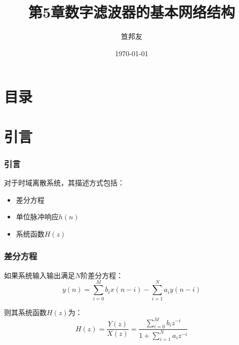 \documentclass[notheorems,compress,mathserif,table]{beamer}
\title{\heiti 第5章\quad 数字滤波器的基本网络结构}
\author[\textcolor{blue}]{{\sihao\kaishu  笪邦友}}
\institute{\sihao\lishu  \textcolor{violet}{中南民族大学~~ 电子信息工程学院}}
\date{\fangsong\today}
\begin{document}
\kaishu
\frame{ \titlepage }
\section*{目录}



\section{引言}
\begin{frame}[shrink]\frametitle{引言}
对于时域离散系统，其描述方式包括：
\begin{itemize}
  \item 差分方程
  \item 单位脉冲响应$h(n)$
  \item 系统函数$H(z)$
\end{itemize}
\end{frame}
\begin{frame}\frametitle{差分方程}
如果系统输入输出满足$N$阶差分方程：
$$
y(n)=\sum_{i=0}^{M}b_ix(n-i) - \sum_{i=1}^{N}a_iy(n-i)
$$
\par 则其系统函数$H(z)$为：
$$H(z)=\frac{Y(z)}{X(z)}= \frac{\sum_{i=0}^{M}
b_iz^{-i}}{1+\sum_{i=1}^{N}a_i z^{-i}}$$
\end{frame}
\end{document}

